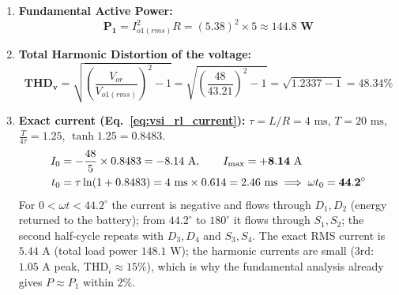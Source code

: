 \documentclass[11pt,a4paper]{article}
\begin{document}
\begin{examplebox}
\begin{enumerate}
  \item \textbf{Fundamental Active Power:}
  \begin{equation*}
  \mathbf{P_1} = I_{o1(rms)}^2 R = (5.38)^2 \times 5 \approx \mathbf{144.8\text{ W}}
  \end{equation*}

  \item \textbf{Total Harmonic Distortion of the voltage:}
  \begin{equation*}
  \mathbf{\text{THD}_v} = \sqrt{\left(\frac{V_{or}}{V_{o1(rms)}}\right)^2 - 1} = \sqrt{\left(\frac{48}{43.21}\right)^2 - 1} = \sqrt{1.2337 - 1} = \mathbf{48.34\%}
  \end{equation*}

  \item \textbf{Exact current (Eq.~\eqref{eq:vsi_rl_current}):} $\tau = L/R = 4\text{ ms}$, $T = 20\text{ ms}$, $\frac{T}{4\tau} = 1.25$, $\tanh 1.25 = 0.8483$.
  \begin{align*}
  I_0 &= -\frac{48}{5}\times 0.8483 = -8.14\text{ A}, \qquad I_{\max} = \mathbf{+8.14\text{ A}} \notag\\
  t_0 &= \tau\ln(1 + 0.8483) = 4\text{ ms}\times 0.614 = 2.46\text{ ms} \;\Longrightarrow\; \omega t_0 = \mathbf{44.2^\circ}
  \end{align*}
  For $0 < \omega t < 44.2^\circ$ the current is negative and flows through $D_1, D_2$ (energy returned to the battery); from $44.2^\circ$ to $180^\circ$ it flows through $S_1, S_2$; the second half-cycle repeats with $D_3, D_4$ and $S_3, S_4$. The exact RMS current is $5.44\text{ A}$ (total load power $148.1\text{ W}$); the harmonic currents are small ($3\text{rd}$: $1.05\text{ A}$ peak, $\text{THD}_i \approx 15\%$), which is why the fundamental analysis already gives $P \approx P_1$ within $2\%$.
\end{enumerate}
\end{examplebox}
\end{document}
